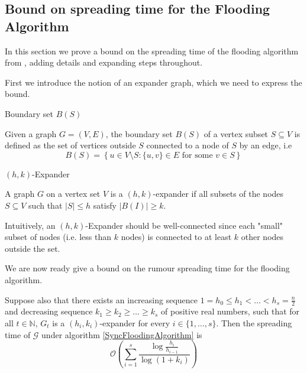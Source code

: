 

\subsection{Bound on spreading time for the Flooding Algorithm}

In this section we prove a bound on the spreading time of the flooding algorithm from \cite{syncPaper}, adding details and expanding steps throughout.

First we introduce the notion of an expander graph, which we need to express the bound.

\begin{definition}
	Boundary set $B(S)$

	\noindent 
	Given a graph $G=(V,E)$, the boundary set $B(S)$ of a vertex subset $S \subseteq V$ is defined as the set of vertices outside $S$ connected to a node of $S$ by an edge, i.e
	$$
		B(S) = \left\{u \in V \setminus S : \{u, v\} \in E \text{ for some } v \in S \right\}
	$$
\end{definition}


\begin{definition}
	$(h, k)$-Expander

	\noindent
	A graph $G$ on a vertex set $V$ is a $(h, k)$-expander if all subsets of the nodes $S \subseteq V$ such that $|S| \leq h$ satisfy $|B(I)| \geq k$.
\end{definition}

Intuitively, an $(h, k)$-Expander should be well-connected since each "small" subset of nodes (i.e. less than $k$ nodes) is connected to at least $k$ other nodes outside the set.  

We are now ready give a bound on the rumour spreading time for the flooding algorithm.

\begin{theorem}\label{theorem:DeterministicFloodingBound}
	\ModelIntro Suppose also that there exists an increasing sequence $1 = h_0 \leq h_1 < \dots < h_s = \frac{n}{2}$ and decreasing sequence $k_1 \geq k_2 \geq \dots \geq k_s$ of positive real numbers, such that for all $t \in \mathbb{N}$, $G_t$ is a $(h_i, k_i)$-expander for every $i \in \{1, \dots , s\}$. Then the spreading time of $\mathcal{G}$ under algorithm \ref{SyncFloodingAlgorithm} is
	$$
		\mathcal{O}\left(\sum_{i=1}^s \frac{\log \frac{h_i}{h_{i-1}}}{\log(1+k_i)}\right)
	$$
\end{theorem}


